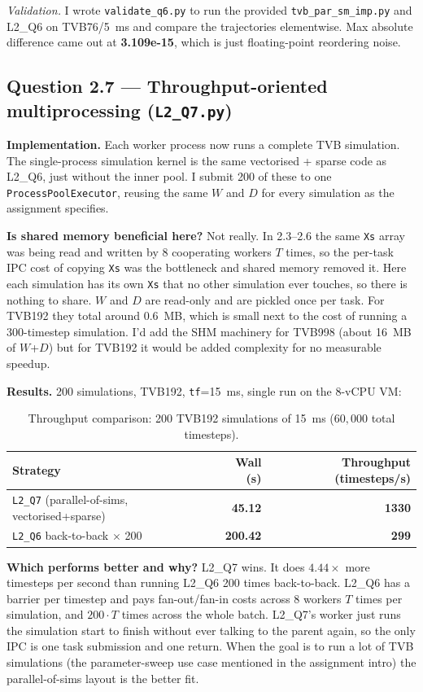 \documentclass[11pt,a4paper]{article}
\newcommand{\Q}[1]{\subsection*{Question #1}}
\begin{document}
\textit{Validation.} I wrote \texttt{validate\_q6.py} to run the
provided \texttt{tvb\_par\_sm\_imp.py} and L2\_Q6 on TVB76/5~ms and
compare the trajectories elementwise. Max absolute difference came
out at \textbf{3.109e-15}, which is just floating-point reordering
noise.

\Q{2.7 — Throughput-oriented multiprocessing (\texttt{L2\_Q7.py})}

\textbf{Implementation.} Each worker process now runs a complete TVB
simulation. The single-process simulation kernel is the same
vectorised + sparse code as L2\_Q6, just without the inner pool. I
submit 200 of these to one \texttt{ProcessPoolExecutor}, reusing the
same $W$ and $D$ for every simulation as the assignment specifies.

\textbf{Is shared memory beneficial here?} Not really. In 2.3--2.6
the same \texttt{Xs} array was being read and written by 8
cooperating workers $T$ times, so the per-task IPC cost of copying
\texttt{Xs} was the bottleneck and shared memory removed it. Here
each simulation has its own \texttt{Xs} that no other simulation ever
touches, so there is nothing to share. $W$ and $D$ are read-only and
are pickled once per task. For TVB192 they total around 0.6~MB,
which is small next to the cost of running a 300-timestep
simulation. I'd add the SHM machinery for TVB998 (about 16~MB of
$W$+$D$) but for TVB192 it would be added complexity for no
measurable speedup.

\textbf{Results.} 200 simulations, TVB192, \texttt{tf}=15~ms, single
run on the 8-vCPU VM:

\begin{table}[h]
\centering
\small
\begin{tabular}{lrr}
\toprule
Strategy & Wall (s) & Throughput (timesteps/s) \\
\midrule
\texttt{L2\_Q7} (parallel-of-sims, vectorised+sparse) & \textbf{45.12}    & \textbf{1330} \\
\texttt{L2\_Q6} back-to-back $\times$ 200             & \textbf{200.42} & \textbf{299} \\
\bottomrule
\end{tabular}
\caption{Throughput comparison: 200 TVB192 simulations of 15~ms
($60{,}000$ total timesteps).}
\end{table}

\textbf{Which performs better and why?} L2\_Q7 wins. It does
$4.44\times$ more timesteps per second than running L2\_Q6 200 times
back-to-back. L2\_Q6 has a barrier per timestep and pays
fan-out/fan-in costs across 8 workers $T$ times per simulation, and
$200 \cdot T$ times across the whole batch. L2\_Q7's worker just runs
the simulation start to finish without ever talking to the parent
again, so the only IPC is one task submission and one return. When
the goal is to run a lot of TVB simulations (the parameter-sweep use
case mentioned in the assignment intro) the parallel-of-sims layout
is the better fit.
\end{document}
